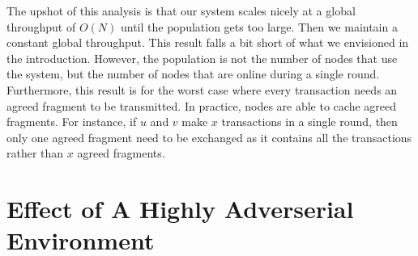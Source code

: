 The upshot of this analysis is that our system scales nicely at a global throughput of $O(N)$ until the population gets too large.
Then we maintain a constant global throughput.
This result falls a bit short of what we envisioned in the introduction.
However, the population is not the number of nodes that use the system, but the number of nodes that are online during a single round.
Furthermore, this result is for the worst case where every transaction needs an agreed fragment to be transmitted.
In practice, nodes are able to cache agreed fragments.
For instance, if $u$ and $v$ make $x$ transactions in a single round,
then only one agreed fragment need to be exchanged as it contains all the transactions rather than $x$ agreed fragments.

\section{Effect of A Highly Adverserial Environment}
